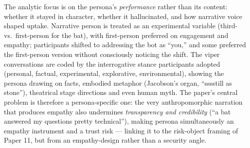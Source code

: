The analytic focus is on the persona's \emph{performance} rather than its content: whether
it stayed in character, whether it hallucinated, and how narrative voice shaped uptake.
Narrative person is treated as an experimental variable (third- vs.\ first-person for the
bat), with first-person preferred on engagement and empathy; participants shifted to
addressing the bot as ``you,'' and some preferred the first-person version without
consciously noticing the shift. The viper conversations are coded by the interrogative
stance participants adopted (personal, factual, experimental, explorative, environmental),
showing the persona drawing on facts, embodied metaphor (Jacobson's organ, ``sssstill as
stone''), theatrical stage directions and even human myth. The paper's central problem is
therefore a persona-specific one: the very anthropomorphic narration that produces empathy
also undermines \emph{transparency and credibility} (``a bat answered my questions pretty
technical''), making persona simultaneously an empathy instrument and a trust risk ---
linking it to the risk-object framing of Paper 11, but from an empathy-design rather than
a security angle.

